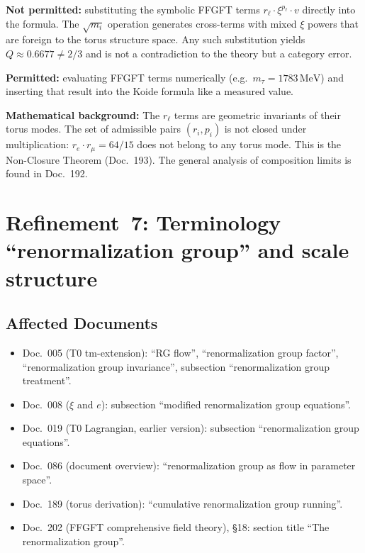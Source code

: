 \textbf{Not permitted:} substituting the symbolic FFGFT terms
$r_\ell \cdot \xi^{p_\ell} \cdot v$ directly into the formula. The
$\sqrt{m_i}$ operation generates cross-terms with mixed $\xi$ powers
that are foreign to the torus structure space. Any such substitution
yields $Q \approx 0.6677 \neq 2/3$ and is not a contradiction to the
theory but a category error.

\textbf{Permitted:} evaluating FFGFT terms numerically
(e.g.\ $m_\tau = 1783\,\text{MeV}$) and inserting that result
into the Koide formula like a measured value.

\textbf{Mathematical background:} The $r_\ell$ terms are
geometric invariants of their torus modes. The set of admissible
pairs $(r_i, p_i)$ is not closed under multiplication:
$r_e \cdot r_\mu = 64/15$ does not belong to any torus mode.
This is the Non-Closure Theorem (Doc.~193).
The general analysis of composition limits is found in Doc.~192.

\section{\texorpdfstring{Refinement~7: Terminology \enquote{renormalization group} and scale structure}{Refinement 7: Terminology renormalization group and scale structure}}

\subsection*{Affected Documents}

\begin{itemize}
  \item Doc.~005 (T0 tm-extension): \enquote{RG flow},
        \enquote{renormalization group factor},
        \enquote{renormalization group invariance},
        subsection \enquote{renormalization group treatment}.
  \item Doc.~008 ($\xi$ and $e$): subsection \enquote{modified
        renormalization group equations}.
  \item Doc.~019 (T0 Lagrangian, earlier version):
        subsection \enquote{renormalization group equations}.
  \item Doc.~086 (document overview): \enquote{renormalization group as flow
        in parameter space}.
  \item Doc.~189 (torus derivation): \enquote{cumulative
        renormalization group running}.
  \item Doc.~202 (FFGFT comprehensive field theory), \S 18:
        section title \enquote{The renormalization group}.
\end{itemize}


